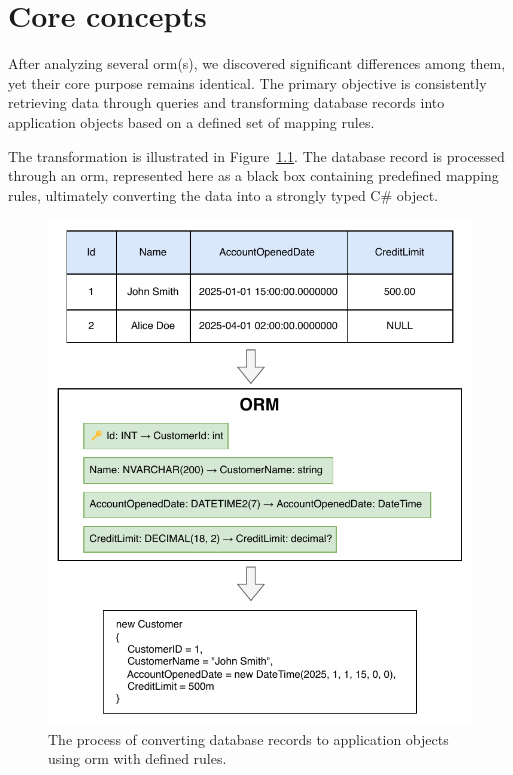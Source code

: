 \chapter{Core concepts}

After analyzing several \acrshort{orm}(s), we discovered significant differences among them, yet their core purpose remains identical. The primary objective is consistently retrieving data through queries and transforming database records into application objects based on a defined set of mapping rules.

The transformation is illustrated in Figure~\ref{fig:db_to_orm}. The database record is processed through an \acrshort{orm}, represented here as a black box containing predefined mapping rules, ultimately converting the data into a strongly typed C\# object.


\begin{figure}[h]
  \centering
  \includegraphics[scale=1.0]{thesis/img/thesis/02_orm_transformation.drawio.pdf}
  \caption{The process of converting database records to application objects using \acrshort{orm} with defined rules.}
  \label{fig:db_to_orm}
\end{figure}

